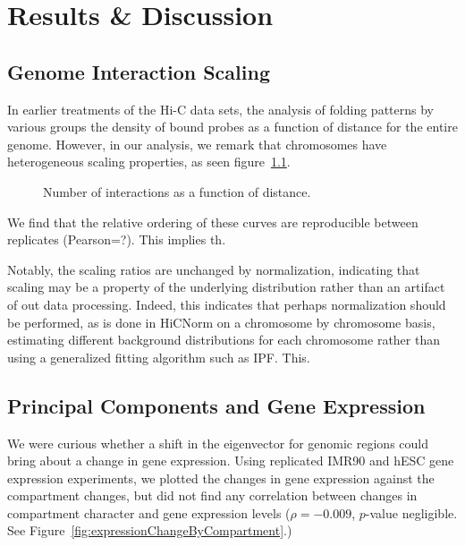 \chapter{Results \& Discussion}

\section*{Genome Interaction Scaling}
In earlier treatments of the Hi-C data sets, the analysis of folding patterns by various groups \citep{imakaev2012} \citep{dixon2012}
the density of bound probes as a function of distance for the entire genome.  However, in our analysis, we remark that chromosomes
have heterogeneous scaling properties, as seen figure~\ref{fig:interactionScaling}.

\begin{figure}[h]
  \caption{Number of interactions as a function of distance.}\label{fig:interactionScaling}
\end{figure}

We find that the relative ordering of these curves are reproducible between replicates (Pearson=?).  This implies th.

Notably, the scaling ratios are unchanged by normalization, indicating that scaling may be a property of the underlying distribution
rather than an artifact of out data processing.  Indeed, this indicates that perhaps normalization should be performed, as is
done in HiCNorm \citep{hu2012} on a chromosome by chromosome basis, estimating different background distributions for each chromosome
rather than using a generalized fitting algorithm such as IPF\@.  This.

\section*{Principal Components and Gene Expression}

We were curious whether a shift in the eigenvector for genomic regions could bring about a change in gene expression.  Using replicated
IMR90 and hESC gene expression experiments, we plotted the changes in gene expression against the compartment changes, but did not
find any correlation between changes in compartment character and gene expression levels ($\rho = -0.009$, $p$-value negligible.
See Figure~\ref{fig:expressionChangeByCompartment}.)

